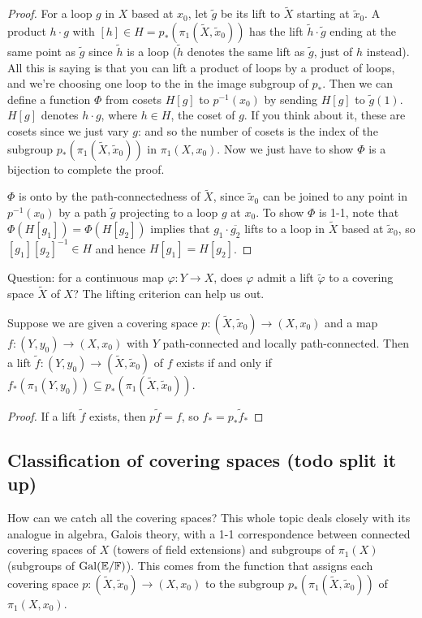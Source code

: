 \begin{proof}
    For a loop $g$ in $X$ based at $x_0$, let $\widetilde g$ be its lift to $\widetilde X$ starting at $\widetilde x_0$. A product $h\cdot g$ with $[h]\in H=p_*(\pi_1(\widetilde X,\widetilde x_0))$ has the lift $\widetilde h \cdot \widetilde g$ ending at the same point as $\widetilde g$ since $\widetilde h$ is a loop ($\widetilde h$ denotes the same lift as $\widetilde g$, just of $h$ instead). All this is saying is that you can lift a product of loops by a product of loops, and we're choosing one loop to the in the image subgroup of $p_*$. Then we can define a function $\Phi$ from cosets $H[g]$ to $p ^{-1}(x_0)$ by sending $H[g]$ to $\widetilde g(1)$. $H[g]$ denotes $h\cdot g$, where $h\in H$, the coset of $g$. If you think about it, these are cosets since we just vary $g$: and so the number of cosets is the index of the subgroup $p_*(\pi_1(\widetilde X,\widetilde x_0))$ in $\pi_1(X,x_0)$. Now we just have to show $\Phi$ is a bijection to complete the proof.

    $\Phi$ is onto by the path-connectedness of $\widetilde X$, since $\widetilde x_0$ can be joined to any point in $p ^{-1}(x_0)$ by a path $\widetilde g$ projecting to a loop $g$ at $x_0$. To show $\Phi$ is 1-1, note that $\Phi(H[g_1])=\Phi(H[g_2])$ implies that $g_1\cdot \overline{g_2}$ lifts to a loop in $\widetilde X$ based at $\widetilde x_0$, so $[g_1][g_2]^{-1}\in H$ and hence $H[g_1]=H[g_2]$.
\end{proof}
\orbreak
Question: for a continuous map $\varphi \colon Y \to X$, does $\varphi $ admit a lift $\widetilde \varphi $ to a covering space $\widetilde X$ of $X$? The lifting criterion can help us out.
\begin{theorem}
    Suppose we are given a covering space $p \colon (\widetilde X,\widetilde x_0) \to (X,x_0)$ and a map $f \colon (Y,y_0) \to (X,x_0)$ with $Y$ path-connected and locally path-connected. Then a lift $\widetilde f \colon (Y,y_0) \to (\widetilde X,\widetilde x_0) $ of $f$ exists if and only if $f_*(\pi_1(Y,y_0))\subseteq p_*(\pi_1(\widetilde X,\widetilde x_0))$.
\end{theorem}
\begin{proof}
If a lift $\widetilde f$ exists, then $p\widetilde f=f$, so $f_*=p_* \widetilde f_*$
\end{proof}

\subsection{Classification of covering spaces (todo split it up)}
How can we catch all the covering spaces? This whole topic deals closely with its analogue in algebra, Galois theory, with a 1-1 correspondence between connected covering spaces of $X$ (towers of field extensions) and subgroups of $\pi_1(X)$ (subgroups of $\operatorname{Gal}(\mathbb{E} /\mathbb{F})$). This comes from the function that assigns each covering space $p \colon (\widetilde X,\widetilde x_0) \to (X,x_0)$ to the subgroup $p_* (\pi_1(\widetilde X,\widetilde x_0))$ of $\pi_1(X,x_0)$.

